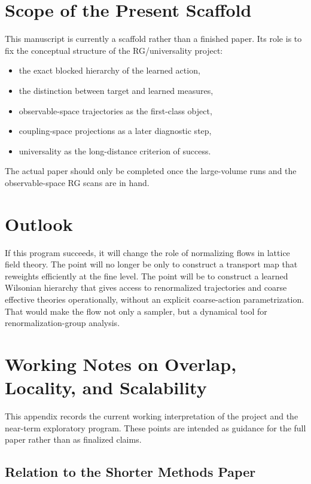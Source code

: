 \documentclass[aps,prd,reprint,nofootinbib,superscriptaddress,longbibliography]{revtex4-2}
\begin{document}
\section{Scope of the Present Scaffold}
\label{sec:scope}

This manuscript is currently a scaffold rather than a finished paper. Its role
is to fix the conceptual structure of the RG/universality project:
\begin{itemize}
\item the exact blocked hierarchy of the learned action,
\item the distinction between target and learned measures,
\item observable-space trajectories as the first-class object,
\item coupling-space projections as a later diagnostic step,
\item universality as the long-distance criterion of success.
\end{itemize}

The actual paper should only be completed once the large-volume runs and the
observable-space RG scans are in hand.

\section{Outlook}
\label{sec:outlook}

If this program succeeds, it will change the role of normalizing flows in
lattice field theory. The point will no longer be only to construct a transport
map that reweights efficiently at the fine level. The point will be to construct
a learned Wilsonian hierarchy that gives access to renormalized trajectories and
coarse effective theories operationally, without an explicit coarse-action
parametrization. That would make the flow not only a sampler, but a dynamical
tool for renormalization-group analysis.

\appendix

\section{Working Notes on Overlap, Locality, and Scalability}
\label{app:working_notes}

This appendix records the current working interpretation of the project and the
near-term exploratory program. These points are intended as guidance for the
full paper rather than as finalized claims.

\subsection{Relation to the Shorter Methods Paper}
\end{document}
